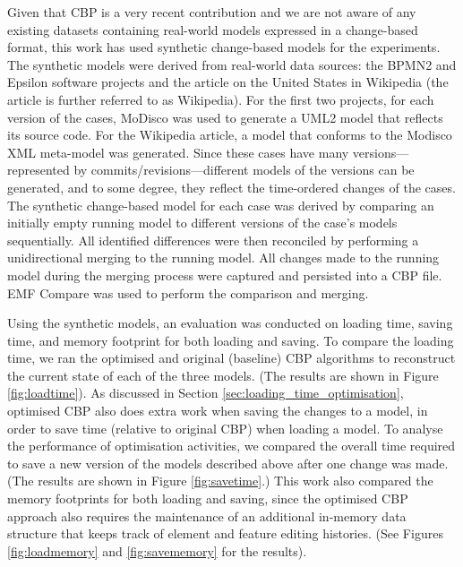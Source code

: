   Given that CBP is a very recent contribution and we are not aware of any existing datasets containing real-world models expressed in a change-based format, this work has used synthetic change-based models for the experiments. The synthetic models were derived from real-world data sources: the BPMN2 \cite{eclipse2017bpmn2,eclipse2018bpmn2git} and Epsilon \cite{eclipse2017epsilon,eclipse2018epsilongit} software projects and the article on the United States \cite{wikipedia2018us} in Wikipedia (the article is further referred to as Wikipedia). For the first two projects, for each version of the cases, MoDisco \cite{DBLP:journals/infsof/BruneliereCDM14} was used to generate a UML2 \cite{eclipse2017uml2} model that reflects its source code. For the Wikipedia article, a model that conforms to the Modisco XML meta-model \cite{eclipse2018modiscoxml} was generated. Since these cases have many versions—represented by commits/revisions—different models of the versions can be generated, and to some degree, they reflect the time-ordered changes of the cases. The synthetic change-based model for each case was derived by comparing an initially empty running model to different versions of the case’s models sequentially. All identified differences were then reconciled by performing a unidirectional merging to the running model. All changes made to the running model during the merging process were captured and persisted into a CBP file. EMF Compare was used \cite{eclipse2017compare} to perform the comparison and merging.
  
  Using the synthetic models, an evaluation was conducted on loading time, saving time, and memory footprint for both loading and saving. To compare the loading time, we ran the optimised and original (baseline) CBP algorithms to reconstruct the current state of each of the three models. (The results are shown in Figure \ref{fig:loadtime}). As discussed in Section \ref{sec:loading_time_optimisation}, optimised CBP also does extra work when saving the changes to a model, in order to save time (relative to original CBP) when loading a model. To analyse the performance of optimisation activities, we compared the overall time required to save a new version of the models described above after one change was made. (The results are shown in Figure \ref{fig:savetime}.) This work also compared the memory footprints for both loading and saving, since the optimised CBP approach also requires the maintenance of an additional in-memory data structure that keeps track of element and feature editing histories. (See Figures \ref{fig:loadmemory} and \ref{fig:savememory} for the results).
  
